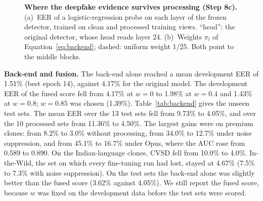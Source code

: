 \documentclass[10pt,a4paper,twocolumn]{article}
\begin{document}
\begin{figure}[t]
\caption{\textbf{Where the deepfake evidence survives processing (Step 8c).} (a)~EER of a logistic-regression probe on each layer of the frozen detector, trained on clean and processed training views. ``head'': the original detector, whose head reads layer 24. (b)~Weights $\pi_l$ of Equation~\ref{eq:backend}; dashed: uniform weight $1/25$. Both point to the middle blocks.}
\label{fig:layers}
\end{figure}

\textbf{Back-end and fusion.} The back-end alone reached a mean development EER of 1.51\% (best epoch 14), against 4.17\% for the original model. The development EER of the fused score fell from 4.17\% at $w=0$ to 1.98\% at $w=0.4$ and 1.43\% at $w=0.8$; $w=0.85$ was chosen (1.39\%). Table~\ref{tab:backend} gives the unseen test sets. The mean EER over the 13 test sets fell from 9.73\% to 4.05\%, and over the 10 processed sets from 11.36\% to 4.50\%. The largest gains were on premium clones: from 8.2\% to 3.0\% without processing, from 34.0\% to 12.7\% under noise suppression, and from 45.1\% to 16.7\% under Opus, where the AUC rose from 0.589 to 0.890. On the Indian-language clones, CVSD fell from 10.0\% to 4.0\%. In-the-Wild, the set on which every fine-tuning run had lost, stayed at 4.67\% (7.5\% to 7.3\% with noise suppression). On the test sets the back-end alone was slightly better than the fused score (3.62\% against 4.05\%). We still report the fused score, because $w$ was fixed on the development data before the test sets were scored.
\end{document}
